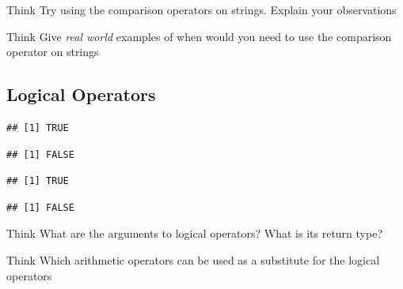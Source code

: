\begin{DIY}{Think}
Try using the comparison operators on strings. Explain your observations
\end{DIY}

\begin{DIY}{Think}
Give \emph{real world} examples of when would you need to use the comparison operator on strings
\end{DIY}

\subsection{Logical Operators}
\begin{knitrout}
\color{fgcolor}\begin{kframe}
\begin{alltt}
\hlstd{(} \hlopt{>} \hlstd{)} \hlopt{&} \hlstd{(} \hlopt{>=} \hlstd{)} 
\end{alltt}
\begin{verbatim}
## [1] TRUE
\end{verbatim}
\begin{alltt}
\hlstd{(} \hlopt{>} \hlstd{)} \hlopt{&} \hlstd{(} \hlopt{<} \hlstd{)}
\end{alltt}
\begin{verbatim}
## [1] FALSE
\end{verbatim}
\begin{alltt}
\hlstd{(} \hlopt{>} \hlstd{)} \hlopt{|} \hlstd{(} \hlopt{<} \hlstd{)} 
\end{alltt}
\begin{verbatim}
## [1] TRUE
\end{verbatim}
\begin{alltt}
\hlopt{!}\hlstd{(} \hlopt{>} \hlstd{)} 
\end{alltt}
\begin{verbatim}
## [1] FALSE
\end{verbatim}
\end{kframe}
\end{knitrout}
\begin{DIY}{Think}
What are the arguments to logical operators? What is its return type? 
\end{DIY}

\begin{DIY}{Think}
Which arithmetic operators can be used as a substitute for the logical operators
\end{DIY}


